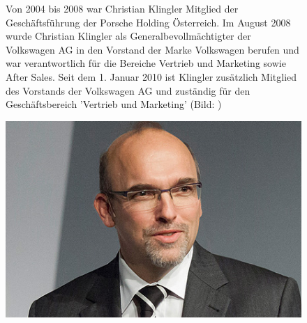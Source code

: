 \documentclass[12pt]{article}
\begin{document}
\begin{figure}[here!]
	\centering
	\begin{minipage}[h]{0.65\textwidth}
		Von 2004 bis 2008 war Christian Klingler Mitglied der Geschäftsführung der Porsche Holding Österreich.
		Im August 2008 wurde Christian Klingler als Generalbevollmächtigter der Volkswagen AG in den Vorstand der Marke Volkswagen berufen und war verantwortlich für die Bereiche Vertrieb und Marketing sowie After Sales. Seit dem 1. Januar 2010 ist Klingler zusätzlich Mitglied des Vorstands der Volkswagen AG und zuständig für den Geschäftsbereich 'Vertrieb und Marketing'  (Bild: \cite{ckpic} )
	\end{minipage}
	\begin{minipage}[h]{0.10\textwidth}
		\hspace{1cm} 
	\end{minipage}
	\begin{minipage}[h]{0.20\textwidth}
		\centering
		\includegraphics[width=1.0\textwidth]{images/ChristianKlingler.jpg}
		\label{fig:vorstandvw3}
	\end{minipage}
\end{figure}
\end{document}
